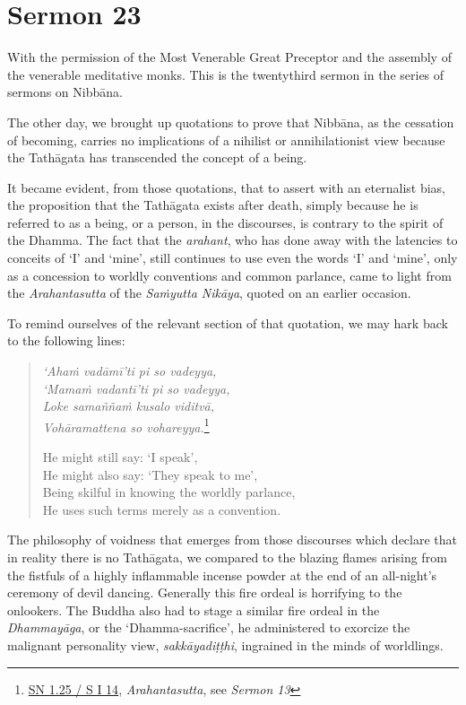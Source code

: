 \chapter{Sermon 23}

\NibbanaOpeningQuote

With the permission of the Most Venerable Great Preceptor and the assembly of the venerable meditative monks. This is the twentythird sermon in the series of sermons on Nibbāna.

The other day, we brought up quotations to prove that Nibbāna, as the cessation of becoming, carries no implications of a nihilist or annihilationist view because the Tathāgata has transcended the concept of a being.

It became evident, from those quotations, that to assert with an eternalist bias, the proposition that the Tathāgata exists after death, simply because he is referred to as a being, or a person, in the discourses, is contrary to the spirit of the Dhamma. The fact that the \emph{arahant}, who has done away with the latencies to conceits of `I' and `mine', still continues to use even the words `I' and `mine', only as a concession to worldly conventions and common parlance, came to light from the \emph{Arahantasutta} of the \emph{Saṁyutta Nikāya}, quoted on an earlier occasion.

To remind ourselves of the relevant section of that quotation, we may hark back to the following lines:

\begin{quote}
\emph{`Ahaṁ vadāmī'ti pi so vadeyya,}\\
\emph{`Mamaṁ vadantī'ti pi so vadeyya,}\\
\emph{Loke samaññaṁ kusalo viditvā,}\\
\emph{Vohāramattena so vohareyya.}\footnote{\href{https://suttacentral.net/sn1.25/pli/ms}{SN 1.25 / S I 14}, \emph{Arahantasutta}, see \emph{Sermon 13}}

He might still say: `I speak',\\
He might also say: `They speak to me',\\
Being skilful in knowing the worldly parlance,\\
He uses such terms merely as a convention.
\end{quote}

The philosophy of voidness that emerges from those discourses which declare that in reality there is no Tathāgata, we compared to the blazing flames arising from the fistfuls of a highly inflammable incense powder at the end of an all-night's ceremony of devil dancing. Generally this fire ordeal is horrifying to the onlookers. The Buddha also had to stage a similar fire ordeal in the \emph{Dhammayāga}, or the `Dhamma-sacrifice', he administered to exorcize the malignant personality view, \emph{sakkāyadiṭṭhi}, ingrained in the minds of worldlings.

